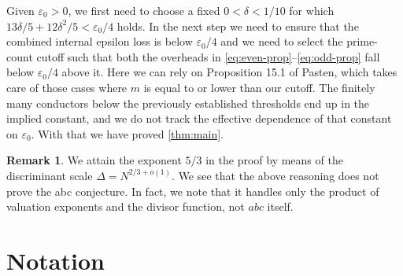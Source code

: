 \documentclass[11pt,reqno]{amsart}
\theoremstyle{definition}
\newtheorem{remark}[theorem]{Remark}
\newcommand{\eps}{\varepsilon}
\begin{document}
Given $\eps_0>0$, we first need to choose a fixed $0<\delta<1/10$ for which
$13\delta/5+12\delta^2/5<\eps_0/4$ holds. In the next step we need to ensure that the combined internal epsilon loss is below
$\eps_0/4$ and we need to select the prime-count cutoff such that both the overheads
in \eqref{eq:even-prop}--\eqref{eq:odd-prop} fall below $\eps_0/4$ above it. Here we can rely on Proposition 15.1 of Pasten, which takes care of those cases
where $m$ is equal to or lower than our cutoff. The finitely many conductors below the previously established thresholds end
up in the implied constant, and we do not track the effective dependence of
that constant on $\eps_0$. With that we have proved \cref{thm:main}.

\begin{remark}
We attain the exponent $5/3$ in the proof by means of the discriminant scale
$\Delta=N^{2/3+o(1)}$.  
We see that the above reasoning does not prove the abc conjecture.
In fact, we note that it handles only the product of valuation exponents and
the divisor function, not $abc$ itself.
\end{remark}


\section*{Notation}
\end{document}
